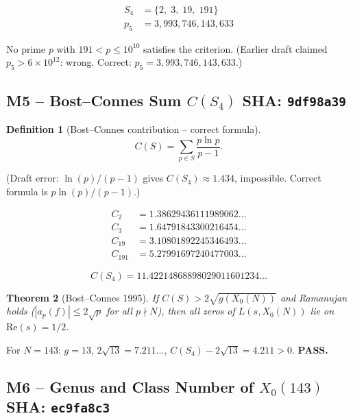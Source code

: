 \documentclass[12pt,letterpaper]{article}
\newtheorem{theorem}{Theorem}[section]
\newtheorem{definition}[theorem]{Definition}
\begin{document}
\begin{align}
  S_4 &= \{2,\; 3,\; 19,\; 191\}  \label{eq:S4}\\
  p_5 &= 3{,}993{,}746{,}143{,}633  \label{eq:p5}
\end{align}

No prime $p$ with $191 < p \leq 10^{10}$ satisfies the criterion.
(Earlier draft claimed $p_5 > 6 \times 10^{12}$: wrong.
Correct: $p_5 = 3{,}993{,}746{,}143{,}633$.)

\subsection{M5 -- Bost--Connes Sum $C(S_4)$ \hfill SHA: \texttt{9df98a39}}

\begin{definition}[Bost--Connes contribution -- correct formula]
\begin{equation}
  C(S) = \sum_{p \in S} \frac{p \ln p}{p - 1}.
  \label{eq:BC}
\end{equation}
\end{definition}

\noindent (Draft error: $\ln(p)/(p-1)$ gives $C(S_4) \approx 1.434$, impossible.
Correct formula is $p \ln(p)/(p-1)$.)

\begin{align}
  C_2    &= 1.38629436111989062\ldots \\
  C_3    &= 1.64791843300216454\ldots \\
  C_{19} &= 3.10801892245346493\ldots \\
  C_{191}&= 5.27991697240477003\ldots
\end{align}

\begin{equation}
  C(S_4) = 11.42214868898029011601234\ldots  \label{eq:CS4}
\end{equation}

\begin{theorem}[Bost--Connes 1995]
  If $C(S) > 2\sqrt{g(X_0(N))}$ and Ramanujan holds
  ($|a_p(f)| \leq 2\sqrt{p}$ for all $p \nmid N$),
  then all zeros of $L(s, X_0(N))$ lie on $\mathrm{Re}(s) = 1/2$.
\end{theorem}

For $N = 143$: $g = 13$, $2\sqrt{13} = 7.211\ldots$,
$C(S_4) - 2\sqrt{13} = 4.211 > 0$. \textbf{PASS.}

\subsection{M6 -- Genus and Class Number of $X_0(143)$ \hfill SHA: \texttt{ec9fa8c3}}
\end{document}
